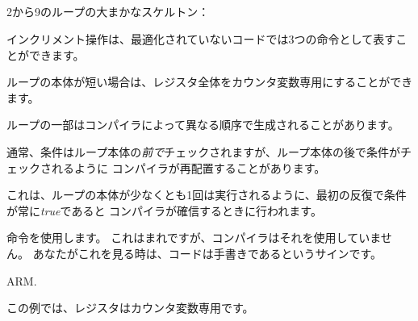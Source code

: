 ﻿%
\subsection{\Conclusion{}}

2から9のループの大まかなスケルトン：



インクリメント操作は、最適化されていないコードでは3つの命令として表すことができます。



ループの本体が短い場合は、レジスタ全体をカウンタ変数専用にすることができます。



ループの一部はコンパイラによって異なる順序で生成されることがあります。



通常、条件はループ本体の\emph{前で}チェックされますが、ループ本体の後で条件がチェックされるように
コンパイラが再配置することがあります。

これは、ループの本体が少なくとも1回は実行されるように、最初の反復で条件が常に\emph{true}であると
コンパイラが確信するときに行われます。




命令を使用します。 これはまれですが、コンパイラはそれを使用していません。
あなたがこれを見る時は、コードは手書きであるというサインです。



ARM. 

この例では、レジスタはカウンタ変数専用です。




